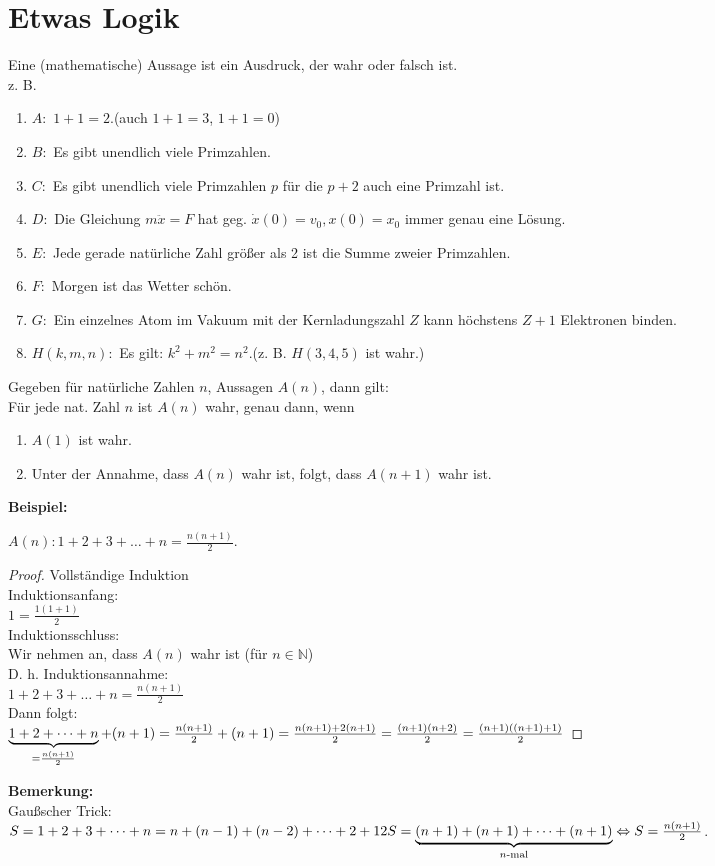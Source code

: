 \documentclass[12pt,a4paper,titlepage]{article} %
\newcommand{\bsp}{\textbf{Beispiel:}}
\newcommand{\bemerkung}{\textbf{Bemerkung:}}
\begin{document}
\section{Etwas Logik}
Eine (mathematische) Aussage ist ein Ausdruck, der wahr oder falsch ist.\\
z. B.
\begin{enumerate}
  \item $A :$ \glqq $1+1=2$.\grqq (auch \glqq $1+1=3$\grqq, \glqq $1+1=0$\grqq)
  \item $B :$ \glqq Es gibt unendlich viele Primzahlen.\grqq
  \item $C :$ \glqq Es gibt unendlich viele Primzahlen $p$ für die $p + 2$ auch eine Primzahl ist.\grqq
  \item $D :$ \glqq Die Gleichung $m \ddot{x} = F$ hat geg. $\dot{x}(0) = v_0, x(0) = x_0$ immer genau eine Lösung.\grqq
  \item $E :$ \glqq Jede gerade natürliche Zahl größer als 2 ist die Summe zweier Primzahlen.\grqq
  \item $F :$ \glqq Morgen ist das Wetter schön.\grqq
  \item $G :$ \glqq Ein einzelnes Atom im Vakuum mit der Kernladungszahl $Z$ kann höchstens $Z+1$ Elektronen binden.\grqq
  \item $H(k,m,n) :$ \glqq Es gilt: $k^2 + m^2 = n^2$.\grqq (z. B. $H(3,4,5)$ ist wahr.)    
\end{enumerate}
Gegeben für natürliche Zahlen $n$, Aussagen $A(n)$, dann gilt:\\
Für jede nat. Zahl $n$ ist $A(n)$ wahr, genau dann, wenn 
\begin{enumerate}
  \item $A(1)$ ist wahr.
  \item Unter der Annahme, dass $A(n)$ wahr ist, folgt, dass $A(n+1)$ wahr ist.
\end{enumerate}
\bsp 
\begin{center}
$A(n): 1+2+3+\dots+n=\frac{n(n+1)}{2}$.
\end{center}
\begin{proof} Vollständige Induktion\\
  Induktionsanfang:\\
  $1 = \frac{1(1+1)}{2}$ \checkmark\\
  Induktionsschluss:\\
  Wir nehmen an, dass $A(n)$ wahr ist (für $n\in\mathbb{N}$)\\
  D. h. Induktionsannahme:\\
  $1+2+3+\dots+n=\frac{n(n+1)}{2}$\\
  Dann folgt:\\
  $\underbrace{1+2+\dots+n}_{=\frac{n(n+1)}{2}}+(n+1)=\frac{n(n+1)}{2}+(n+1) \\
  =\frac{n(n+1) + 2(n+1)}{2} = \frac{(n+1)(n+2)}{2} = \frac{(n+1)((n+1)+1)}{2}$
\end{proof}
\bemerkung\\
Gaußscher Trick:\\
$S=1+2+3+\dots+n=n+(n-1)+(n-2)+\dots+2+1\\
2S = \underbrace{(n+1)+(n+1)+\dots+(n+1)}_{n\text{-mal}} \Leftrightarrow S = 
\frac{n(n+1)}{2}$.
\end{document}
